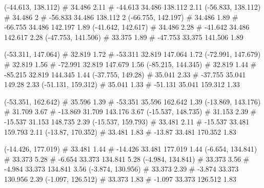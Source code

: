 \documentclass[a4paper,openbib,10pt]{article}
\newenvironment{treegraph}{\begin{graph}}{\end{graph}}
\begin{document}
\begin{treegraph}
  (-44.613, 138.112) #     34.486    2.11
   #    -44.613    34.486    138.112    2.11
  (-56.833, 138.112) #     34.486    2
   #    -56.833    34.486    138.112    2
  (-66.755, 142.197) #     34.486    1.89
   #    -66.755    34.486    142.197    1.89
  (-41.642, 142.617) #     34.486    2.28
   #    -41.642    34.486    142.617    2.28
  (-47.753, 141.506) #     33.375    1.89
   #    -47.753    33.375    141.506    1.89

  (-53.311, 147.064) #     32.819    1.72
   #    -53.311    32.819    147.064    1.72
  (-72.991, 147.679) #     32.819    1.56
   #    -72.991    32.819    147.679    1.56
  (-85.215, 144.345) #     32.819    1.44
   #    -85.215    32.819    144.345    1.44
  (-37.755, 149.28) #     35.041    2.33
   #    -37.755    35.041    149.28    2.33
  (-51.131, 159.312) #     35.041    1.33
   #    -51.131    35.041    159.312    1.33

  (-53.351, 162.642) #     35.596    1.39
   #    -53.351    35.596    162.642    1.39
  (-13.869, 143.176) #     31.709    3.67
   #    -13.869    31.709    143.176    3.67
  (-15.537, 148.735) #     31.153    2.39
   #    -15.537    31.153    148.735    2.39
  (-15.537, 159.793) #     33.481    2.11
   #    -15.537    33.481    159.793    2.11
  (-13.87, 170.352) #     33.481    1.83
   #    -13.87    33.481    170.352    1.83

  (-14.426, 177.019) #     33.481    1.44
   #    -14.426    33.481    177.019    1.44
  (-6.654, 134.841) #     33.373    5.28
   #    -6.654    33.373    134.841    5.28
  (-4.984, 134.841) #     33.373    3.56
   #    -4.984    33.373    134.841    3.56
  (-3.874, 130.956) #     33.373    2.39
   #    -3.874    33.373    130.956    2.39
  (-1.097, 126.512) #     33.373    1.83
   #    -1.097    33.373    126.512    1.83


\end{treegraph}
\end{document}
